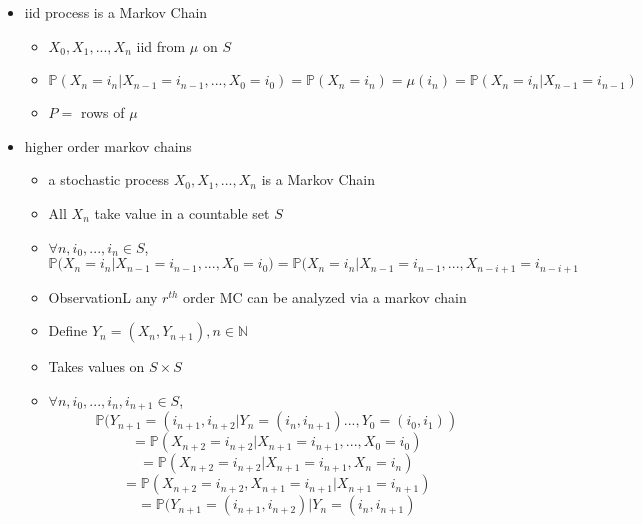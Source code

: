 \documentclass{article}
\begin{document}
\begin{itemize}
    \item iid process is a Markov Chain
    \begin{itemize}
        \item $X_0, X_1, ..., X_n$ iid from $\mu$ on $S$
        \item $\mathbb{P}(X_n=i_n |  X_{n-1}=i_{n-1}, ... , X_0 = i_0) = \mathbb{P}(X_n = i_n)  = \mu(i_n) = \mathbb{P}(X_n=i_n | X_{n-1}=i_{n-1})$
        \item $P =$ rows of $\mu$
    \end{itemize}
    \item higher order markov chains
    \begin{itemize}
        \item a stochastic process $X_0, X_1, ..., X_n$ is a Markov Chain
        \item All $X_n$ take value in a countable set $S$
        \item $\forall n, i_0, ..., i_n \in S$, $$\mathbb{P}(X_n=i_n | X_{n-1}=i_{n-1}, ... , X_0 = i_0) = \mathbb{P}(X_n = i_n | X_{n-1}=i_{n-1}, ..., X_{n-i+1} = i_{n-i+1}$$
        \item ObservationL any $r^{th}$ order MC can be analyzed via a markov chain
    \item Define $Y_n=(X_{n}, Y_{n+1}), n \in \mathbb{N}$
    \item Takes values on $S\times S$
    \item $\forall n, i_0, ..., i_n, i_{n+1} \in S$, $$\mathbb{P}(Y_{n+1}=(i_{n+1}, i_{n+2} | Y_n = (i_n, i_{n+1}) ..., Y_0 = (i_0, i_1))$$
    $$= \mathbb{P}(X_{n+2}=i_{n+2} | X_{n+1}=i_{n+1}, ... , X_0 = i_0)$$
    $$= \mathbb{P}(X_{n+2}=i_{n+2} | X_{n+1}=i_{n+1},X_n = i_n)$$
    $$= \mathbb{P}(X_{n+2}=i_{n+2}, X_{n+1} = i_{n+1} | X_{n+1}=i_{n+1})$$
    $$= \mathbb{P}(Y_{n+1}=(i_{n+1}, i_{n+2}) | Y_{n}=(i_{n},i_{n+1})$$
    \end{itemize}
\end{itemize}
\end{document}
